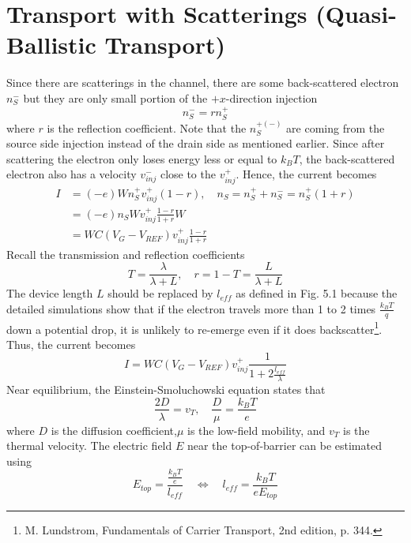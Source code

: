 \section{Transport with Scatterings (Quasi-Ballistic Transport)}
Since there are scatterings in the channel, there are some back-scattered electron $n_{S}^{-}$ but they are only small portion of the $+x$-direction injection \begin{equation}
    n_{S}^{-} = rn_{S}^{+}
\end{equation} where $r$ is the reflection coefficient. Note that the $n_{S}^{+(-)}$ are coming from the source side injection instead of the drain side as mentioned earlier. Since after scattering the electron only loses energy less or equal to $k_{B}T$, the back-scattered electron also has a velocity $v_{inj}^{-}$ close to the $v_{inj}^{+}$. Hence, the current becomes \begin{align}
    I& = (-e)Wn_{S}^{+}v_{inj}^{+}(1-r),\quad n_{S} = n_{S}^{+} + n_{S}^{-} = n_{S}^{+}(1+r)\nonumber\\
    & = (-e)n_{S}Wv_{inj}^{+}\frac{1-r}{1+r}W\nonumber\\
    & = WC(V_{G}-V_{REF})v_{inj}^{+}\frac{1-r}{1+r}
\end{align} Recall the transmission and reflection coefficients \begin{equation}
    T = \frac{\lambda}{\lambda + L}, \quad r = 1 - T = \frac{L}{\lambda + L}
\end{equation} The device length $L$ should be replaced by $l_{eff}$ as defined in Fig. 5.1 because the detailed simulations show that if the electron travels more than 1 to 2 times $\frac{k_{B}T}{q}$ down a potential drop, it is unlikely to re-emerge even if it does backscatter\footnote{M. Lundstrom, Fundamentals of Carrier Transport, 2nd edition, p. 344.}. Thus, the current becomes \begin{equation}
    I = WC(V_{G}-V_{REF})v_{inj}^{+}\frac{1}{1+2\frac{l_{eff}}{\lambda}}
\end{equation} Near equilibrium, the Einstein-Smoluchowski equation states that \begin{equation}
    \frac{2D}{\lambda} = v_{T},\quad \frac{D}{\mu} = \frac{k_{B}T}{e} 
\end{equation} where $D$ is the diffusion coefficient,$\mu$ is the low-field mobility, and $v_{T}$ is the thermal velocity. The electric field $E$ near the top-of-barrier can be estimated using \begin{equation}
    E_{top} = \frac{\frac{k_{B}T}{e}}{l_{eff}}\quad\Leftrightarrow\quad l_{eff} = \frac{k_{B}T}{eE_{top}}

\end{equation}
